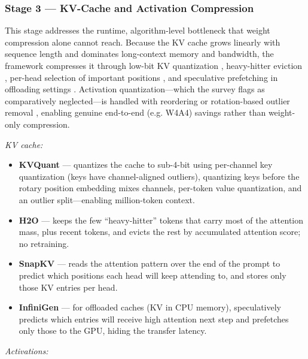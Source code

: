 \subsubsection{Stage 3 --- KV-Cache and Activation Compression}

This stage addresses the runtime, algorithm-level bottleneck that weight compression alone cannot reach. Because the KV cache grows linearly with sequence length and dominates long-context memory and bandwidth, the framework compresses it through low-bit KV quantization \cite{hooper2024kvquant}, heavy-hitter eviction \cite{zhang2023h2o}, per-head selection of important positions \cite{li2024snapkv}, and speculative prefetching in offloading settings \cite{lee2024infinigen}. Activation quantization---which the survey flags as comparatively neglected---is handled with reordering \cite{yuan2023rptq} or rotation-based outlier removal \cite{ashkboos2024quarot}, enabling genuine end-to-end (e.g. W4A4) savings rather than weight-only compression.

\emph{KV cache:}

\begin{itemize}

  \item \textbf{KVQuant} \cite{hooper2024kvquant} --- quantizes the cache to sub-4-bit using per-channel key quantization (keys have channel-aligned outliers), quantizing keys before the rotary position embedding mixes channels, per-token value quantization, and an outlier split---enabling million-token context.

  \item \textbf{H2O} \cite{zhang2023h2o} --- keeps the few ``heavy-hitter'' tokens that carry most of the attention mass, plus recent tokens, and evicts the rest by accumulated attention score; no retraining.

  \item \textbf{SnapKV} \cite{li2024snapkv} --- reads the attention pattern over the end of the prompt to predict which positions each head will keep attending to, and stores only those KV entries per head.

  \item \textbf{InfiniGen} \cite{lee2024infinigen} --- for offloaded caches (KV in CPU memory), speculatively predicts which entries will receive high attention next step and prefetches only those to the GPU, hiding the transfer latency.

\end{itemize}

\emph{Activations:}

